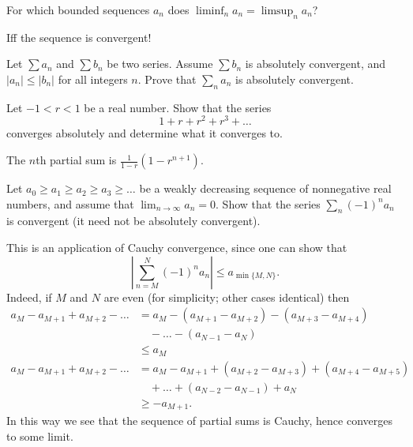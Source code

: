 \begin{problem}
	For which bounded sequences $a_n$
	does $\liminf_n a_n = \limsup_n a_n$?
	\begin{hint}
		Iff the sequence is convergent!
	\end{hint}
\end{problem}

\begin{dproblem}
	Let $\sum a_n$ and $\sum b_n$ be two series.
	Assume $\sum b_n$ is absolutely convergent,
	and $|a_n| \le |b_n|$ for all integers $n$.
	Prove that $\sum_n a_n$ is absolutely convergent.
\end{dproblem}

\begin{problem}
	\label{prob:geometric}
	Let $-1 < r < 1$ be a real number.
	Show that the series
	\[ 1 + r + r^2 + r^3 + \dots \]
	converges absolutely and determine what it converges to.
	\begin{hint}
		The $n$th partial sum is $\frac{1}{1-r} (1-r^{n+1})$.
	\end{hint}
\end{problem}


\begin{problem}
	Let $a_0 \ge a_1 \ge a_2 \ge a_3 \ge \dots$ be a weakly decreasing sequence
	of nonnegative real numbers,
	and assume that $\lim_{n \to \infty} a_n = 0$.
	Show that the series $\sum_n (-1)^n a_n$ is convergent
	(it need not be absolutely convergent).
	\begin{sol}
		This is an application of Cauchy convergence, since
		one can show that
		\[ \left\lvert \sum_{n=M}^N (-1)^n a_n \right\rvert \le a_{\min\{M,N\}}. \]
		Indeed, if $M$ and $N$ are even
		(for simplicity; other cases identical) then
		\begin{align*}
			a_M - a_{M+1} + a_{M+2} - \dots
			&= a_M - (a_{M+1}-a_{M+2}) - (a_{M+3}-a_{M+4}) \\
			&\quad- \dots - (a_{N-1} - a_N) \\
			&\le a_M \\
			a_M - a_{M+1} + a_{M+2} - \dots
			&= a_M - a_{M+1} + (a_{M+2} - a_{M+3}) + (a_{M+4} - a_{M+5}) \\
			&\quad+ \dots + (a_{N-2} - a_{N-1}) + a_N \\
			&\ge -a_{M+1}.
		\end{align*}
		In this way we see that the sequence of partial sums is Cauchy,
		hence converges to some limit.
	\end{sol}
\end{problem}


